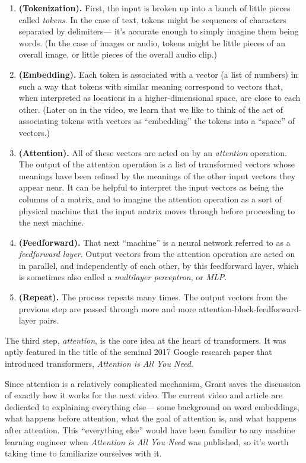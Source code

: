 \documentclass{article}
\begin{document}
\begin{enumerate}
	\item \textbf{(Tokenization).} First, the input is broken up into a bunch of little pieces called \textit{tokens}. In the case of text, tokens might be sequences of characters separated by delimiters--- it's accurate enough to simply imagine them being words. (In the case of images or audio, tokens might be little pieces of an overall image, or little pieces of the overall audio clip.)
	\item \textbf{(Embedding).} Each token is associated with a vector (a list of numbers) in such a way that tokens with similar meaning correspond to vectors that, when interpreted as locations in a higher-dimensional space, are close to each other. (Later on in the video, we learn that we like to think of the act of associating tokens with vectors as ``embedding'' the tokens into a ``space'' of vectors.)
	\item \textbf{(Attention).} All of these vectors are acted on by an \textit{attention} operation. The output of the attention operation is a list of transformed vectors whose meanings have been refined by the meanings of the other input vectors they appear near. It can be helpful to interpret the input vectors as being the columns of a matrix, and to imagine the attention operation as a sort of physical machine that the input matrix moves through before proceeding to the next machine.
	\item \textbf{(Feedforward).} That next ``machine'' is a neural network referred to as a \textit{feedforward layer}. Output vectors from the attention operation are acted on in parallel, and independently of each other, by this feedforward layer, which is sometimes also called a \textit{multilayer perceptron}, or \textit{MLP}.
	\item \textbf{(Repeat).} The process repeats many times. The output vectors from the previous step are passed through more and more attention-block-feedforward-layer pairs.
\end{enumerate}

The third step, \textit{attention}, is the core idea at the heart of transformers. It was aptly featured in the title of the seminal 2017 Google research paper that introduced transformers, \textit{Attention is All You Need}.

Since attention is a relatively complicated mechanism, Grant saves the discussion of exactly how it works for the next video. The current video and article are dedicated to explaining everything else--- some background on word embeddings, what happens before attention, what the goal of attention is, and what happens after attention. This ``everything else'' would have been familiar to any machine learning engineer when \textit{Attention is All You Need} was published, so it's worth taking time to familiarize ourselves with it.
\end{document}
